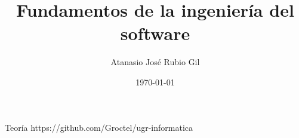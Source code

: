 \documentclass[10pt]{report}
\author{Atanasio José Rubio Gil}
\title{Fundamentos de la ingeniería del software}
\date{\today}
\begin{document}
            {Teoría}
            {https://github.com/Groctel/ugr-informatica}
\tableofcontents


\end{document}
